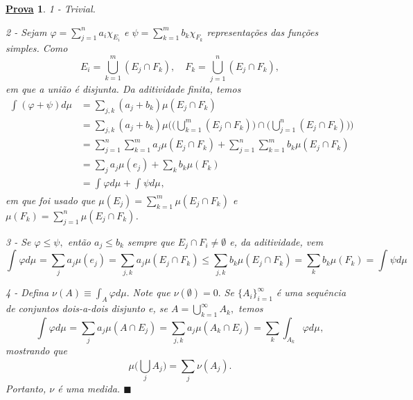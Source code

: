 \documentclass{article}
\newtheorem*{proof*}{\underline{Prova}}
\renewcommand\qedsymbol{$\blacksquare$}
\begin{document}
 \begin{proof*}
   1 - Trivial. 

   2 - Sejam \(\varphi  = \sum\limits_{j=1}^{n}a_{i}\chi_{E_{i}}\) e \(\psi = \sum\limits_{k=1}^{m}b_{k}\chi_{F_{k}}\)  representações das funções simples. Como 
     \[
       E_{i} = \bigcup_{k=1}^{m}(E_{j}\cap F_{k}), \quad F_{k} = \bigcup_{j=1}^{n}(E_{j}\cap F_{k}),
     \]
    em que a união é disjunta. Da aditividade finita, temos 
   \begin{align*}
     \int_{}(\varphi +\psi) d\mu_{} &= \sum\limits_{j, k}^{}(a_{j} + b_{k})\mu (E_{j}\cap F_{k})\\ 
                                    &= \sum\limits_{j, k}^{}(a_{j} + b_{k})\mu \biggl(\biggl(\bigcup_{k=1}^{m}(E_{j}\cap F_{k})\biggr)\cap \biggl(\bigcup_{j=1}^{n}(E_{j}\cap F_{k})\biggr)\biggr) \\ 
                                    &= \sum\limits_{j=1}^{n}\sum\limits_{k=1}^{m}a_{j}\mu (E_{j}\cap F_{k}) + \sum\limits_{j=1}^{n}\sum\limits_{k=1}^{m}b_{k}\mu (E_{j}\cap F_{k})\\ 
                                    &= \sum\limits_{j}^{}a_{j}\mu (e_{j}) + \sum\limits_{k}^{}b_{k}\mu (F_{k})\\ 
                                    &= \int_{}\varphi  d\mu_{} + \int_{}\psi d\mu_{},
   \end{align*}
   em que foi usado que \(\mu (E_{j}) = \sum\limits_{k=1}^{m}\mu (E_{j}\cap F_{k})\) e \(\mu (F_{k}) = \sum\limits_{j=1}^{n}\mu (E_{j}\cap F_{k})\).

   3 - Se \(\varphi \leq \psi,\) então \(a_{j}\leq b_{k}\) sempre que \(E_{j}\cap F_{i}\neq\emptyset\) e, da aditividade, vem 
     \[
       \int_{}\varphi  d\mu_{} = \sum\limits_{j}^{}a_{j}\mu (e_{j}) = \sum\limits_{j, k}^{}a_{j}\mu (E_{j}\cap F_{k}) \leq \sum\limits_{j, k}^{}b_{k}\mu (E_{j}\cap F_{k}) = \sum\limits_{k}^{}b_{k}\mu (F_{k}) = \int_{}\psi d\mu_{}
     \]

  4 - Defina \(\nu(A)\equiv \int_{A}^{}\varphi d\mu .\) Note que \(\nu(\emptyset )=0.\) Se \(\{A_{i}\}_{i=1}^{\infty}\) é uma sequência de conjuntos dois-a-dois disjunto e, se \(A = \bigcup_{k=1}^{\infty}A_{k},\) temos 
    \[
      \int_{}\varphi  d\mu_{} = \sum\limits_{j}^{}a_{j}\mu (A\cap E_{j}) = \sum\limits_{j, k}^{}a_{j}\mu (A_{k}\cap E_{j}) = \sum\limits_{k}^{}\int_{A_{k}}\varphi  d\mu_{},
    \]
  mostrando que 
    \[
      \mu \biggl(\bigcup_{j}^{}A_{j}\biggr) = \sum\limits_{j}^{}\nu(A_{j}).
    \]
  Portanto, \(\nu\) é uma medida. \qedsymbol
 \end{proof*}
\newpage
\end{document}
